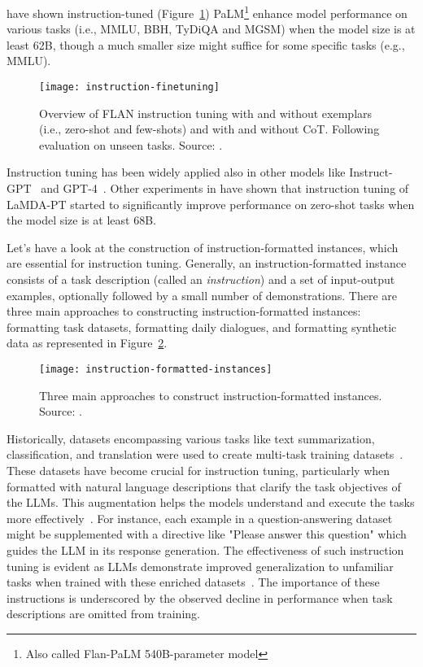 \textcite{chung2022scaling} have shown instruction-tuned (Figure~\ref{fig:instruction-finetuning}) PaLM\footnote{Also called Flan-PaLM 540B-parameter model} enhance model performance on various tasks (i.e., MMLU, BBH, TyDiQA and MGSM) when the model size is at least 62B, though a much smaller size might suffice for some specific tasks (e.g., MMLU).

\begin{figure}[h!]
	\centering
	\texttt{[image: instruction-finetuning]}
	\caption{Overview of FLAN instruction tuning with and without exemplars (i.e., zero-shot and few-shots) and with and without CoT. Following evaluation on unseen tasks. Source: \textcite{chung2022scaling}.}
	\label{fig:instruction-finetuning}
\end{figure}

Instruction tuning has been widely applied also in other models like Instruct-GPT~\cite{ouyang2022training} and GPT-4~\cite{radford2023gpt4}.
Other experiments in \textcite{wei2022fine} have shown that instruction tuning of LaMDA-PT started to significantly improve performance on zero-shot tasks when the model size is at least 68B\@.

Let's have a look at the construction of instruction-formatted instances, which are essential for instruction tuning.
Generally, an instruction-formatted instance consists of a task description (called an \textit{instruction}) and a set of input-output examples, optionally followed by a small number of demonstrations.
There are three main approaches to constructing instruction-formatted instances: formatting task datasets, formatting daily dialogues, and formatting synthetic data as represented in Figure~\ref{fig:instruction-formatted-instances}.

\begin{figure}[h!]
	\centering
	\texttt{[image: instruction-formatted-instances]}
	\caption{Three main approaches to construct instruction-formatted instances. Source: \textcite{survey}.}
	\label{fig:instruction-formatted-instances}
\end{figure}

Historically, datasets encompassing various tasks like text summarization, classification, and translation were used to create multi-task training datasets~\cite{tang2022mvp,liu2019multi,aghajanyan2021muppet}.
These datasets have become crucial for instruction tuning, particularly when formatted with natural language descriptions that clarify the task objectives of the LLMs. This augmentation helps the models understand and execute the tasks more effectively~\cite{sanhetal2022multitask,ouyang2022training,wei2022fine, wang2022super}.
For instance, each example in a question-answering dataset might be supplemented with a directive like "Please answer this question" which guides the LLM in its response generation.
The effectiveness of such instruction tuning is evident as LLMs demonstrate improved generalization to unfamiliar tasks when trained with these enriched datasets~\cite{wei2022fine}.
The importance of these instructions is underscored by the observed decline in performance when task descriptions are omitted from training.


